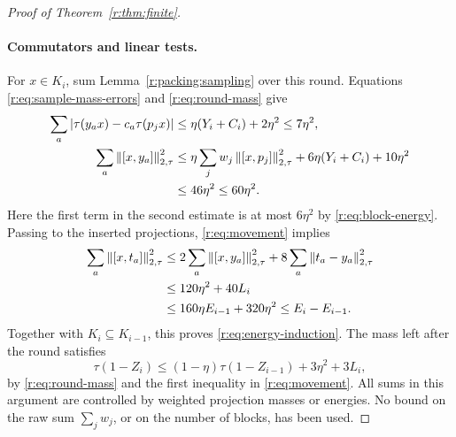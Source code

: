 \begin{proof}[Proof of Theorem~\ref{r:thm:finite}]
\paragraph{Commutators and linear tests.}
For \(x\in K_i\), sum Lemma~\ref{r:packing:sampling} over this round.
Equations \eqref{r:eq:sample-mass-errors} and \eqref{r:eq:round-mass}
give
\begin{align}
 \sum_a|\tau(y_ax)-c_a\tau(p_jx)|
 &\leq\eta(Y_i+C_i)+2\eta^2
 \leq7\eta^2,\label{r:eq:round-linear}\\
 \sum_a\left\|[x,y_a]\right\|_{2,\tau}^2
 &\leq\eta\sum_jw_j\left\|[x,p_j]\right\|_{2,\tau}^2
       +6\eta(Y_i+C_i)+10\eta^2\notag\\
 &\leq46\eta^2\leq60\eta^2.
 \label{r:eq:round-sample-energy}
\end{align}
Here the first term in the second estimate is at most \(6\eta^2\)
by \eqref{r:eq:block-energy}. Passing to the inserted projections,
\eqref{r:eq:movement} implies
\begin{align}
 \sum_a\left\|[x,t_a]\right\|_{2,\tau}^2
 &\leq2\sum_a\left\|[x,y_a]\right\|_{2,\tau}^2
        +8\sum_a\left\|t_a-y_a\right\|_{2,\tau}^2\notag\\
 &\leq120\eta^2+40L_i\notag\\
 &\leq160\eta E_{i-1}+320\eta^2
 \leq E_i-E_{i-1}.
 \label{r:eq:round-inserted-energy}
\end{align}
Together with \(K_i\subseteq K_{i-1}\), this proves
\eqref{r:eq:energy-induction}.
The mass left after the round satisfies
\begin{equation}\label{r:eq:remaining-mass}
 \tau(1-Z_i)\leq(1-\eta)\tau(1-Z_{i-1})+3\eta^2+3L_i,
\end{equation}
by \eqref{r:eq:round-mass} and the first inequality in
\eqref{r:eq:movement}.
All sums in this argument are controlled by weighted projection masses
or energies. No bound on the raw sum \(\sum_jw_j\), or on the number of
blocks, has been used.


\end{proof}
